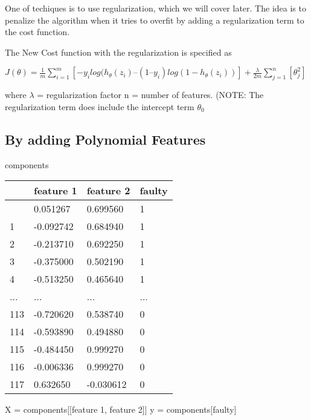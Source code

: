 \documentclass[
  letterpaper,
  DIV=11,
  numbers=noendperiod]{scrreprt}
\newenvironment{Shaded}{\begin{snugshade}}{\end{snugshade}}
\newcommand{\NormalTok}[1]{\textcolor[rgb]{0.00,0.23,0.31}{#1}}
\newcommand{\OperatorTok}[1]{\textcolor[rgb]{0.37,0.37,0.37}{#1}}
\newcommand{\StringTok}[1]{\textcolor[rgb]{0.13,0.47,0.30}{#1}}
\begin{document}
One of techiques is to use regularization, which we will cover later.
The idea is to penalize the algorithm when it tries to overfit by adding
a regularization term to the cost function.

The New Cost function with the regularization is specified as

\(J(\theta ) = \frac{1}{m} \sum_{i=1}^m[-y_i log(h_\theta (z_i) – (1 – y_i) log(1-h_\theta (z_i))] +
                    \frac{\lambda}{2m} \sum_{j=1}^n[\theta_j^2]\)

where \(\lambda\) = regularization factor n = number of features. (NOTE:
The regularization term does include the intercept term \(\theta_0\)

\subsection{By adding Polynomial
Features}\label{by-adding-polynomial-features}

\begin{Shaded}
\begin{Highlighting}[]
\NormalTok{components}
\end{Highlighting}
\end{Shaded}

\begin{longtable}[]{@{}llll@{}}
\toprule\noalign{}
& feature 1 & feature 2 & faulty \\
\midrule\noalign{}
\endhead
\bottomrule\noalign{}
\endlastfoot
0 & 0.051267 & 0.699560 & 1 \\
1 & -0.092742 & 0.684940 & 1 \\
2 & -0.213710 & 0.692250 & 1 \\
3 & -0.375000 & 0.502190 & 1 \\
4 & -0.513250 & 0.465640 & 1 \\
... & ... & ... & ... \\
113 & -0.720620 & 0.538740 & 0 \\
114 & -0.593890 & 0.494880 & 0 \\
115 & -0.484450 & 0.999270 & 0 \\
116 & -0.006336 & 0.999270 & 0 \\
117 & 0.632650 & -0.030612 & 0 \\
\end{longtable}

\begin{Shaded}
\begin{Highlighting}[]
\NormalTok{X }\OperatorTok{=}\NormalTok{ components[[}\StringTok{\textquotesingle{}feature 1\textquotesingle{}}\NormalTok{, }\StringTok{\textquotesingle{}feature 2\textquotesingle{}}\NormalTok{]]}
\NormalTok{y }\OperatorTok{=}\NormalTok{ components[}\StringTok{\textquotesingle{}faulty\textquotesingle{}}\NormalTok{]}
\end{Highlighting}
\end{Shaded}
\end{document}
